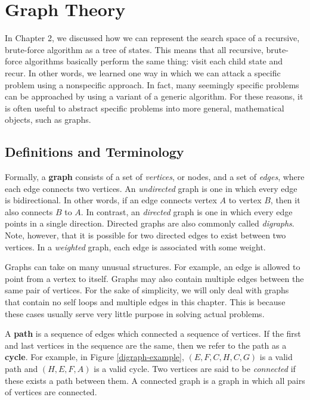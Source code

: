 \chapter{Graph Theory}

In Chapter 2, we discussed how we can represent the search space of a recursive, brute-force algorithm as a tree of states. This means that all recursive, brute-force algorithms basically perform the same thing: visit each child state and recur. In other words, we learned one way in which we can attack a specific problem using a nonspecific approach. In fact, many seemingly specific problems can be approached by using a variant of a generic algorithm. For these reasons, it is often useful to abstract specific problems into more general, mathematical objects, such as graphs. 


\section{Definitions and Terminology}

Formally, a \textbf{graph} consists of a set of \textit{vertices}, or nodes, and a set of \textit{edges}, where each edge connects two vertices. An \textit{undirected} graph is one in which every edge is bidirectional. In other words, if an edge connects vertex $A$ to vertex $B$, then it also connects $B$ to $A$. In contrast, an \textit{directed} graph is one in which every edge points in a single direction. Directed graphs are also commonly called \textit{digraphs}. Note, however, that it is possible for two directed edges to exist between two vertices. In a \textit{weighted} graph, each edge is associated with some weight. 

Graphs can take on many unusual structures. For example, an edge is allowed to point from a vertex to itself. Graphs may also contain multiple edges between the same pair of vertices. For the sake of simplicity, we will only deal with graphs that contain no self loops and multiple edges in this chapter. This is because these cases usually serve very little purpose in solving actual problems. 

A \textbf{path} is a sequence of edges which connected a sequence of vertices.  If the first and last vertices in the sequence are the same, then we refer to the path as a \textbf{cycle}. For example, in Figure \ref{digraph-example}, $(E, F, C, H, C, G)$ is a valid path and $(H, E, F, A)$ is a valid cycle. Two vertices are said to be \textit{connected} if these exists a path between them. A connected graph is a graph in which all pairs of vertices are connected. 

